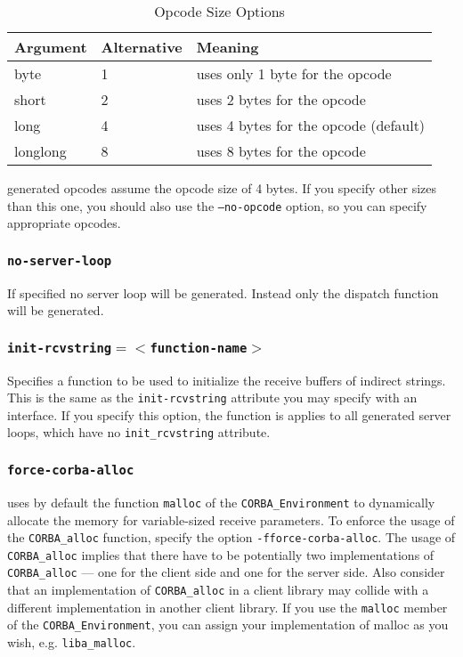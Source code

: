\begin{table}[htb]
\begin{center}
\begin{tabular}{|l|l|l|} \hline
Argument & Alternative & Meaning \\ \hline \hline
byte & 1 & uses only 1 byte for the opcode \\ \hline
short & 2 & uses 2 bytes for the opcode \\ \hline
long & 4 & uses 4 bytes for the opcode (default) \\ \hline
longlong & 8 & uses 8 bytes for the opcode \\ \hline
\end{tabular}
\caption{\label{tab:opcodesize} Opcode Size Options}
\end{center}
\end{table}

\dice{} generated opcodes assume the opcode size of 4 bytes. If you specify
other sizes than this one, you should also use the {\tt --no-opcode} option,
so you can specify appropriate opcodes.

\subsubsection{{\tt no-server-loop}}
If specified no server loop will be generated. Instead only the
dispatch function will be generated.

\subsubsection{{\tt init-rcvstring$=<$function-name$>$}}
Specifies a function to be used to initialize the receive buffers of indirect
strings. This is the same as the \verb|init-rcvstring| attribute you may specify
with an interface. If you specify this option, the function is applies to all
generated server loops, which have no \verb|init_rcvstring| attribute.

\subsubsection{{\tt force-corba-alloc}}
\label{sec:force-corba-alloc}

\dice{} uses by default the function \verb|malloc| of
the \verb|CORBA_Environment| to dynamically allocate
the memory for variable-sized receive parameters. To enforce
the usage of the \verb|CORBA_alloc|
function, specify the option {\tt -fforce-corba-alloc}. The usage of
\verb|CORBA_alloc| implies that there
have to be potentially two implementations of \verb|CORBA_alloc| --- one
for the client side and one for the server side. Also consider that
an implementation of \verb|CORBA_alloc| in a client library may collide with
a different implementation in another client library.
If you use the \verb|malloc| member of the \verb|CORBA_Environment|,
you can assign your implementation of malloc as you wish, e.g.
\verb|liba_malloc|.

